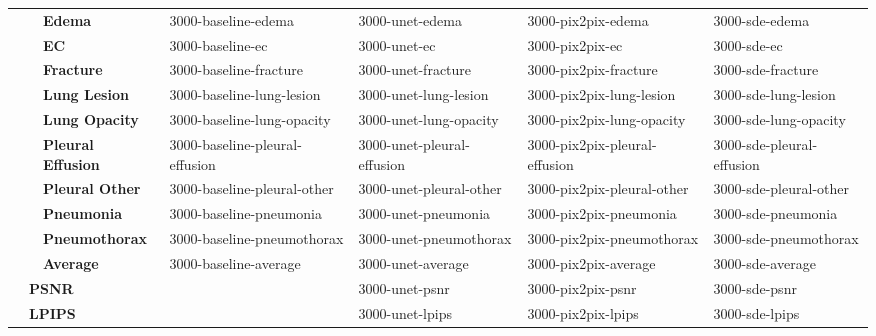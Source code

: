 \begin{table}[]
\begin{tabular}{cll|llll}
                                 &                        & \textbf{Edema} & 3000-baseline-edema & 3000-unet-edema & 3000-pix2pix-edema & 3000-sde-edema \\ 
                                 &                        & \textbf{EC} & 3000-baseline-ec & 3000-unet-ec & 3000-pix2pix-ec & 3000-sde-ec \\ 
                                 &                        & \textbf{Fracture} & 3000-baseline-fracture & 3000-unet-fracture & 3000-pix2pix-fracture & 3000-sde-fracture \\ 
                                 &                        & \textbf{Lung Lesion} & 3000-baseline-lung-lesion & 3000-unet-lung-lesion & 3000-pix2pix-lung-lesion & 3000-sde-lung-lesion \\ 
                                 &                        & \textbf{Lung Opacity} & 3000-baseline-lung-opacity & 3000-unet-lung-opacity & 3000-pix2pix-lung-opacity & 3000-sde-lung-opacity \\ 
                                 &                        & \textbf{Pleural Effusion} & 3000-baseline-pleural-effusion & 3000-unet-pleural-effusion & 3000-pix2pix-pleural-effusion & 3000-sde-pleural-effusion \\ 
                                 &                        & \textbf{Pleural Other} & 3000-baseline-pleural-other & 3000-unet-pleural-other & 3000-pix2pix-pleural-other & 3000-sde-pleural-other \\ 
                                 &                        & \textbf{Pneumonia} & 3000-baseline-pneumonia & 3000-unet-pneumonia & 3000-pix2pix-pneumonia & 3000-sde-pneumonia \\ 
                                 &                        & \textbf{Pneumothorax} & 3000-baseline-pneumothorax & 3000-unet-pneumothorax & 3000-pix2pix-pneumothorax & 3000-sde-pneumothorax \\
                                 &                        & \textbf{Average} & 3000-baseline-average & 3000-unet-average & 3000-pix2pix-average & 3000-sde-average \\ \cline{2-3}
                                 & \multicolumn{2}{l|}{\textbf{PSNR}}            & \cellcolor[HTML]{C0C0C0} & 3000-unet-psnr & 3000-pix2pix-psnr & 3000-sde-psnr \\
                                 & \multicolumn{2}{l|}{\textbf{LPIPS}}           & \cellcolor[HTML]{C0C0C0} & 3000-unet-lpips & 3000-pix2pix-lpips & 3000-sde-lpips \\ \hline
\end{tabular}
\end{table}